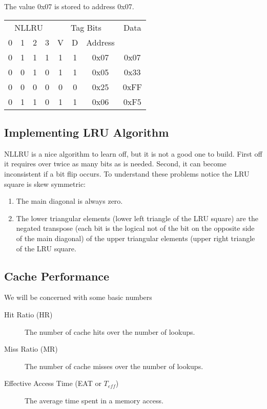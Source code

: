 The value 0x07 is stored to address 0x07.

\vspace{6pt}\noindent
\begin{tabular}{|c|c|c|c|c|c|c|c|}
  \hline
  \multicolumn{4}{|c|}{NLLRU} & \multicolumn{3}{|c|}{Tag Bits} & Data \\
  0 & 1 & 2 & 3 & V & D & Address & \\ \hline
  0 & 1 & 1 & 1 & 1 & 1 & 0x07 & 0x07 \\
  0 & 0 & 1 & 0 & 1 & 1 & 0x05 & 0x33 \\
  0 & 0 & 0 & 0 & 0 & 0 & 0x25 & 0xFF \\
  0 & 1 & 1 & 0 & 1 & 1 & 0x06 & 0xF5 \\
  \hline
\end{tabular}
\vspace{6pt}

\subsection{Implementing LRU Algorithm}

NLLRU is a nice algorithm to learn off, but it is not a good one to build.  First off it requires over twice as many bits as is needed.  Second, it can become inconsistent if a bit flip occurs.  To understand these problems notice the LRU square is skew symmetric:
\begin{enumerate}
\item The main diagonal is always zero.
\item The lower triangular elements (lower left triangle of the LRU square) are the negated transpose (each bit is the logical not of the bit on the opposite side of the main diagonal) of the upper triangular elements (upper right triangle of the LRU square.
\end{enumerate}

\subsection{Cache Performance}

We will be concerned with some basic numbers
\begin{description}
    \item[Hit Ratio (HR)] The number of cache hits over the number of lookups.
    \item[Miss Ratio (MR)] The number of cache misses over the number of lookups.
    \item[Effective Access Time (EAT or $T_{eff}$)] The average time spent in a memory access.
\end{description}

